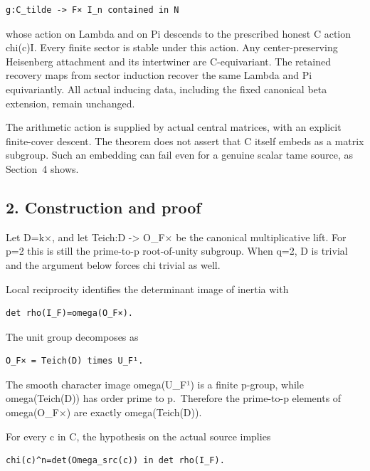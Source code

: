 \begin{Verbatim}[fontsize=\small,breaklines=true,breakanywhere=true]
g:C_tilde -> F× I_n contained in N
\end{Verbatim}

whose action on Lambda and on Pi descends to the prescribed honest C
action chi(c)I. Every finite sector is stable under this action. Any
center-preserving Heisenberg attachment and its intertwiner are
C-equivariant. The retained recovery maps from sector induction recover the
same Lambda and Pi equivariantly. All actual inducing data, including
the fixed canonical beta extension, remain unchanged.

The arithmetic action is supplied by actual central matrices, with an
explicit finite-cover descent. The theorem does not assert that C itself
embeds as a matrix subgroup. Such an embedding can fail even for a
genuine scalar tame source, as Section~4 shows.

\hypertarget{odd_scalar-construction-and-proof}{%
\subsection{2. Construction and proof}\label{odd_scalar-construction-and-proof}}

Let D=k×, and let Teich:D -\textgreater{} O\_F× be the canonical
multiplicative lift. For p=2 this is still the prime-to-p root-of-unity
subgroup. When q=2, D is trivial and the argument below forces chi
trivial as well.

Local reciprocity identifies the determinant image of inertia with

\begin{Verbatim}[fontsize=\small,breaklines=true,breakanywhere=true]
det rho(I_F)=omega(O_F×).
\end{Verbatim}

The unit group decomposes as

\begin{Verbatim}[fontsize=\small,breaklines=true,breakanywhere=true]
O_F× = Teich(D) times U_F¹.
\end{Verbatim}

The smooth character image omega(U\_F¹) is a finite p-group, while
omega(Teich(D)) has order prime to p.~Therefore the prime-to-p elements
of omega(O\_F×) are exactly omega(Teich(D)).

For every c in C, the hypothesis on the actual source implies

\begin{Verbatim}[fontsize=\small,breaklines=true,breakanywhere=true]
chi(c)^n=det(Omega_src(c)) in det rho(I_F).
\end{Verbatim}

